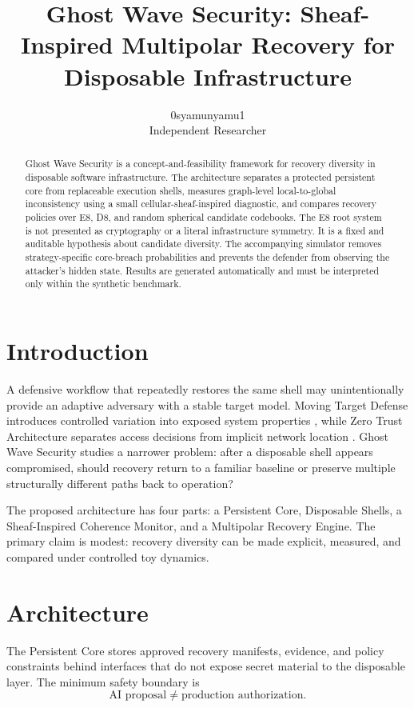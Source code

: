 \documentclass{article}
\title{Ghost Wave Security: Sheaf-Inspired Multipolar Recovery for Disposable Infrastructure}
\author{0syamunyamu1 \\ Independent Researcher}
\begin{document}
\maketitle

\begin{abstract}
Ghost Wave Security is a concept-and-feasibility framework for recovery diversity in disposable software infrastructure. The architecture separates a protected persistent core from replaceable execution shells, measures graph-level local-to-global inconsistency using a small cellular-sheaf-inspired diagnostic, and compares recovery policies over E8, D8, and random spherical candidate codebooks. The E8 root system is not presented as cryptography or a literal infrastructure symmetry. It is a fixed and auditable hypothesis about candidate diversity. The accompanying simulator removes strategy-specific core-breach probabilities and prevents the defender from observing the attacker’s hidden state. Results are generated automatically and must be interpreted only within the synthetic benchmark.
\end{abstract}

\section{Introduction}
A defensive workflow that repeatedly restores the same shell may unintentionally provide an adaptive adversary with a stable target model. Moving Target Defense introduces controlled variation into exposed system properties \cite{jajodia2011mtd}, while Zero Trust Architecture separates access decisions from implicit network location \cite{rose2020zero}. Ghost Wave Security studies a narrower problem: after a disposable shell appears compromised, should recovery return to a familiar baseline or preserve multiple structurally different paths back to operation?

The proposed architecture has four parts: a Persistent Core, Disposable Shells, a Sheaf-Inspired Coherence Monitor, and a Multipolar Recovery Engine. The primary claim is modest: recovery diversity can be made explicit, measured, and compared under controlled toy dynamics.

\section{Architecture}
The Persistent Core stores approved recovery manifests, evidence, and policy constraints behind interfaces that do not expose secret material to the disposable layer. The minimum safety boundary is
\begin{equation}
\text{AI proposal} \neq \text{production authorization}.
\end{equation}
\end{document}
